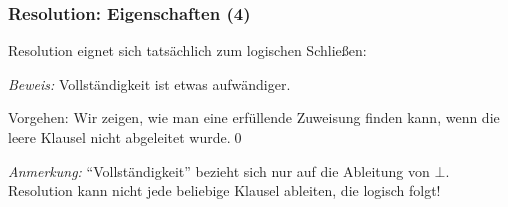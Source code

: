 \documentclass[onlymath]{beamer}
\begin{document}
\begin{frame}[t]\frametitle{Resolution: Eigenschaften (4)}

Resolution eignet sich tatsächlich zum logischen Schließen:\medskip


\emph{Beweis:} \alert{Vollständigkeit} ist etwas aufwändiger.\medskip

Vorgehen: Wir zeigen, wie
man eine erfüllende Zuweisung finden kann, wenn die leere Klausel nicht abgeleitet wurde.\qed
\bigskip

\emph{Anmerkung:} "`Vollständigkeit"' bezieht sich nur auf die Ableitung von $\bot$. Resolution kann nicht
jede beliebige Klausel ableiten, die logisch folgt!

\end{frame}
\end{document}
